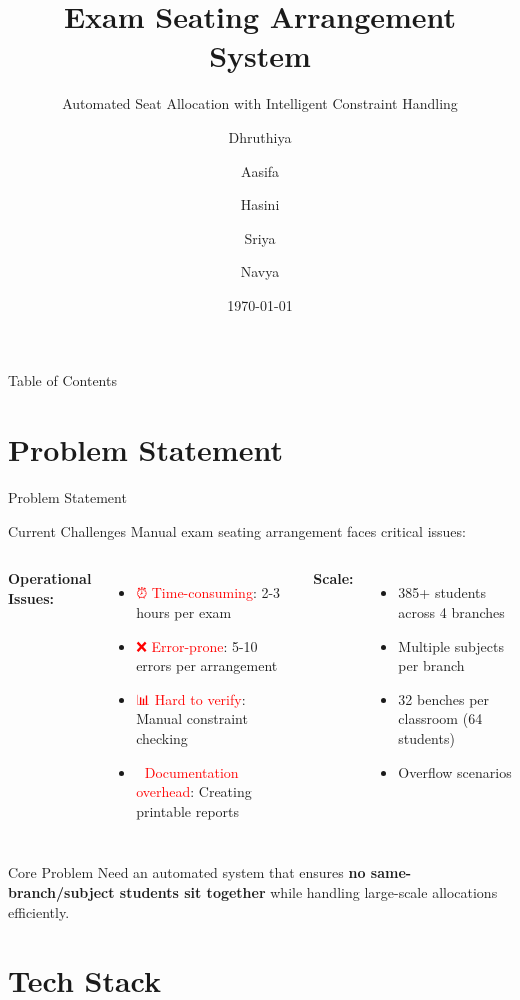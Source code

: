 \documentclass[aspectratio=169]{beamer}
\title{Exam Seating Arrangement System}
\subtitle{Automated Seat Allocation with Intelligent Constraint Handling}
\author{Dhruthiya \and Aasifa \and Hasini \and Sriya \and Navya}
\institute{BVRIT Hyderabad}
\date{\today}
\begin{document}
\frame{\titlepage}

\begin{frame}{Table of Contents}
\tableofcontents
\end{frame}

\section{Problem Statement}

\begin{frame}{Problem Statement}
\begin{block}{Current Challenges}
Manual exam seating arrangement faces critical issues:
\end{block}

\begin{columns}
\textbf{Operational Issues:}
\begin{itemize}
    \item \textcolor{red}{⏰ Time-consuming}: 2-3 hours per exam
    \item \textcolor{red}{❌ Error-prone}: 5-10 errors per arrangement
    \item \textcolor{red}{📊 Hard to verify}: Manual constraint checking
    \item \textcolor{red}{📄 Documentation overhead}: Creating printable reports
\end{itemize}

\textbf{Scale:}
\begin{itemize}
    \item 385+ students across 4 branches
    \item Multiple subjects per branch
    \item 32 benches per classroom (64 students)
    \item Overflow scenarios
\end{itemize}
\end{columns}

\vspace{0.5cm}
\begin{alertblock}{Core Problem}
Need an automated system that ensures \textbf{no same-branch/subject students sit together} while handling large-scale allocations efficiently.
\end{alertblock}
\end{frame}

\section{Tech Stack}
\end{document}
